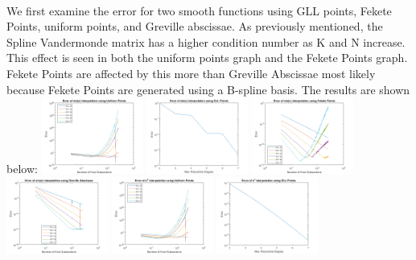 \documentclass{article}
\begin{document}
\paragraph{}
We first examine the error for two smooth functions using GLL points, Fekete Points, uniform points, and Greville abscissae. As previously mentioned, the Spline Vandermonde matrix has a higher condition number as K and N increase. This effect is seen in both the uniform points graph and the Fekete Points graph. Fekete Points are affected by this more than Greville Abscissae most likely because Fekete Points are generated using a B-spline basis. The results are shown below:
\newline
\includegraphics[height = 2.5cm]{SinUniform.png} \includegraphics[height = 2.5cm]{SinGLL.png}
\includegraphics[height = 2.5cm]{SinFekete.png} \includegraphics[height = 2.5cm]{SinGreville.png}
\includegraphics[height = 2.5cm]{ExpUniform.png} \includegraphics[height = 2.5cm]{ExpGLL.png}
\end{document}
